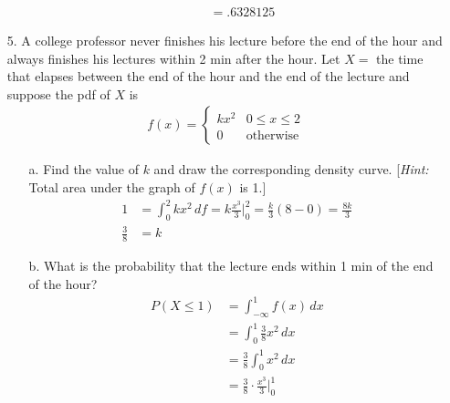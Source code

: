 \documentclass[letterpaper,12pt]{article}
\begin{document}
\begin{enumerate}
\begin{enumerate}
\begin{align*}
          &= .6328125
        \end{align*}
    \end{enumerate}
  \item[5.]
    A college professor never finishes his lecture before the end of the hour and always finishes his lectures within 2 min after the hour. Let $X =$ the time that elapses between the end of the hour and the end of the lecture and suppose the pdf of $X$ is
    \begin{align*}
      f(x) = \begin{cases}
        kx^2 & 0 \le x \le 2 \\
        0    & \text{otherwise}
      \end{cases}
    \end{align*}
    \begin{enumerate}
      \item[a.]
        Find the value of $k$ and draw the corresponding density curve. [\textit{Hint:} Total area under the graph of $f(x)$ is 1.]
        \begin{align*}
          1 &= \int_{0}^{2} kx^2\,df = k\frac{x^3}{3}\bigg\rvert_{0}^{2} = \frac{k}{3}(8 - 0) = \frac{8k}{3} \\
          \frac{3}{8} &= k
        \end{align*}
        \begin{center}
        \end{center}
      \item[b.]
        What is the probability that the lecture ends within 1 min of the end of the hour?
        \begin{align*}
          P(X \le 1) &= \int_{-\infty}^{1} f(x)\,dx \\
          &= \int_{0}^{1} \frac{3}{8}x^2\,dx \\
          &= \frac{3}{8} \int_{0}^{1} x^2\,dx \\
          &= \frac{3}{8} \cdot \frac{x^3}{3}\bigg\rvert_{0}^{1} \\

\end{align*}
\end{enumerate}
\end{enumerate}
\end{document}
